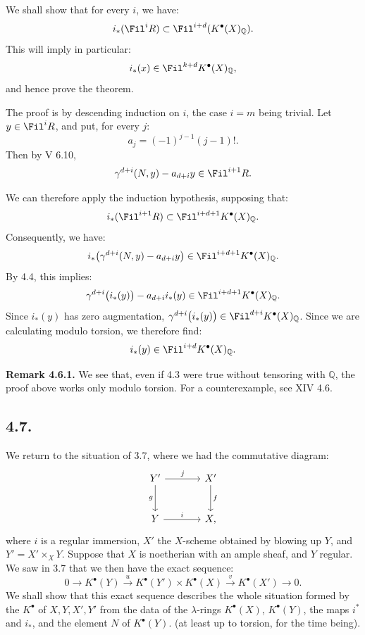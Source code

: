%
We shall show that for every \(i\), we have:
\[
  i_*(\Fil^iR)\subset \Fil^{i+d}(K^{\bullet}(X)_{\mathbb Q}).
\]
This will imply in particular:
\[
  i_*(x)\in\Fil^{k+d}K^{\bullet}(X)_{\mathbb Q},
\]
and hence prove the theorem.

The proof is by descending induction on \(i\), the case \(i=m\) being trivial. Let \(y\in\Fil^iR\), and put, for every \(j\):
\[
  a_j=(-1)^{j-1}(j-1)!.
\]
Then by V 6.10,
\[
  \gamma^{d+i}(N,y)-a_{d+i}y\in\Fil^{i+1}R.
\]

We can therefore apply the induction hypothesis, supposing that:
\[
  i_*(\Fil^{i+1}R)\subset \Fil^{i+d+1}K^{\bullet}(X)_{\mathbb Q}.
\]
Consequently, we have:
\[
  i_*\bigl(\gamma^{d+i}(N,y)-a_{d+i}y\bigr)
  \in\Fil^{i+d+1}K^{\bullet}(X)_{\mathbb Q}.
\]
By 4.4, this implies:
\[
  \gamma^{d+i}\bigl(i_*(y)\bigr)-a_{d+i}i_*(y)
  \in\Fil^{i+d+1}K^{\bullet}(X)_{\mathbb Q}.
\]
Since \(i_*(y)\) has zero augmentation, \(\gamma^{d+i}\bigl(i_*(y)\bigr)\in\Fil^{d+i}K^{\bullet}(X)_{\mathbb Q}\).
Since we are calculating modulo torsion, we therefore find:
\[
  i_*(y)\in\Fil^{i+d}K^{\bullet}(X)_{\mathbb Q}.
\]

\textbf{Remark 4.6.1.} We see that, even if 4.3 were true without tensoring with \(\mathbb Q\), the proof above works only modulo torsion. For a counterexample, see XIV 4.6.

%
\subsection*{4.7.}

We return to the situation of 3.7, where we had the commutative diagram:
\[
\begin{tikzcd}[column sep=large,row sep=large]
Y' \arrow[r,"j"] \arrow[d,"g"'] & X' \arrow[d,"f"]\\
Y \arrow[r,"i"] & X,
\end{tikzcd}
\]
where \(i\) is a regular immersion, \(X'\) the \(X\)-scheme obtained by blowing up \(Y\), and \(Y'=X'\times_XY\). Suppose that \(X\) is noetherian with an ample sheaf, and \(Y\) regular. We saw in 3.7 that we then have the exact sequence:
\[
0\longrightarrow K^{\bullet}(Y)\xrightarrow{u}
K^{\bullet}(Y')\times K^{\bullet}(X)\xrightarrow{v}
K^{\bullet}(X')\longrightarrow0.
\]
We shall show that this exact sequence describes the whole situation formed by the \(K^{\bullet}\) of \(X,Y,X',Y'\) from the data of the \(\lambda\)-rings \(K^{\bullet}(X)\), \(K^{\bullet}(Y)\), the maps \(i^*\) and \(i_*\), and the element \(N\) of \(K^{\bullet}(Y)\). (at least up to torsion, for the time being).

